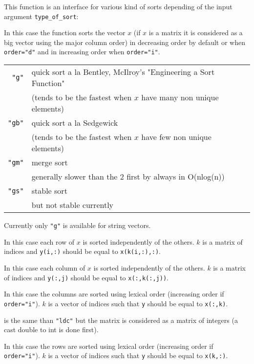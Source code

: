 \begin{mandescription}
This function is an interface for various kind of sorts depending of
the input argument \verb+type_of_sort+:

In this case the function sorts the vector $x$ (if $x$ is a matrix
it is considered as a big vector using the major column order) in 
decreasing order by default or when \verb+order="d"+ and in increasing
order when \verb+order="i"+. 

\begin{tabular}{|r|l|}
\hline
\verb+"g"+  &  quick sort a la Bentley, McIlroy's "Engineering a Sort Function" \\
            &  (tends to be the fastest when $x$ have many non unique elements) \\ 
\hline
\verb+"gb"+  &  quick sort a la Sedgewick \\
            &  (tends to be the fastest when $x$ have few non unique elements) \\ 
\hline
\verb+"gm"+  &  merge sort \\
             &  generally slower than the 2 first by always in  O(nlog(n)) \\
\hline
\verb+"gs"+  &  stable sort \\
             &  but not stable currently \\ 
\hline
\end{tabular}

Currently only \verb+"g"+ is available for string vectors.

In this case each row of $x$ is sorted independently of the others.
$k$ is a matrix of indices and \verb+y(i,:)+ should be equal to
\verb+x(k(i,:),:)+. 

In this case each column of $x$ is sorted independently of the others.
$k$ is a matrix of indices and \verb+y(:,j)+ should be equal to
\verb+x(:,k(:,j))+. 

In this case the columns are sorted using lexical order (increasing 
order if \verb+order="i"+). $k$ is a vector of indices such that \verb+y+ should be equal to
\verb+x(:,k)+. 

is the same than \verb+"ldc"+ but the matrix is considered as a matrix
of integers (a cast double to int is done first).

In this case the rows are sorted using lexical order (increasing 
order if \verb+order="i"+). $k$ is a vector of indices such that \verb+y+ should be equal to
\verb+x(k,:)+. 


\end{mandescription}
